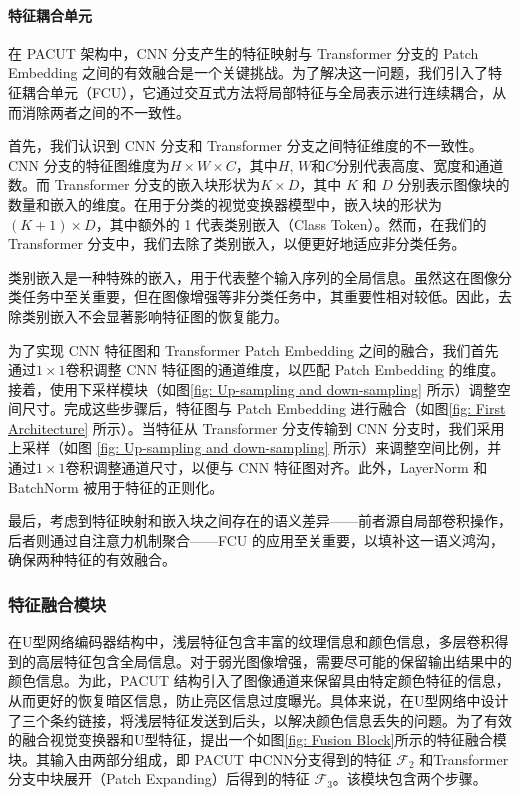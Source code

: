 \documentclass[a4paper]{ctexart}
\begin{document}
	\paragraph{特征耦合单元}
	
	在 PACUT 架构中，CNN 分支产生的特征映射与 Transformer 分支的 Patch Embedding 之间的有效融合是一个关键挑战。为了解决这一问题，我们引入了特征耦合单元（FCU），它通过交互式方法将局部特征与全局表示进行连续耦合，从而消除两者之间的不一致性。
	
	首先，我们认识到 CNN 分支和 Transformer 分支之间特征维度的不一致性。CNN 分支的特征图维度为$H \times W \times C$，其中$H$, $W$和$C$分别代表高度、宽度和通道数。而 Transformer 分支的嵌入块形状为$K \times D$，其中 $K$ 和 $D$ 分别表示图像块的数量和嵌入的维度。在用于分类的视觉变换器模型中，嵌入块的形状为$\left(K+1 \right) \times D$，其中额外的 1 代表类别嵌入（Class Token）。然而，在我们的 Transformer 分支中，我们去除了类别嵌入，以便更好地适应非分类任务。
	
	类别嵌入是一种特殊的嵌入，用于代表整个输入序列的全局信息。虽然这在图像分类任务中至关重要，但在图像增强等非分类任务中，其重要性相对较低。因此，去除类别嵌入不会显著影响特征图的恢复能力。
	
	为了实现 CNN 特征图和 Transformer Patch Embedding 之间的融合，我们首先通过$1 \times 1$卷积调整 CNN 特征图的通道维度，以匹配 Patch Embedding 的维度。接着，使用下采样模块（如图\ref{fig: Up-sampling and down-sampling} 所示）调整空间尺寸。完成这些步骤后，特征图与 Patch Embedding 进行融合（如图\ref{fig: First Architecture} 所示）。当特征从 Transformer 分支传输到 CNN 分支时，我们采用上采样（如图 \ref{fig: Up-sampling and down-sampling} 所示）来调整空间比例，并通过$ 1 \times 1$卷积调整通道尺寸，以便与 CNN 特征图对齐。此外，LayerNorm 和 BatchNorm 被用于特征的正则化。
	
	最后，考虑到特征映射和嵌入块之间存在的语义差异——前者源自局部卷积操作，后者则通过自注意力机制聚合——FCU 的应用至关重要，以填补这一语义鸿沟，确保两种特征的有效融合。
	
	\subsubsection{特征融合模块}
	
	在U型网络编码器结构中，浅层特征包含丰富的纹理信息和颜色信息，多层卷积得到的高层特征包含全局信息。对于弱光图像增强，需要尽可能的保留输出结果中的颜色信息。为此，PACUT 结构引入了图像通道来保留具由特定颜色特征的信息，从而更好的恢复暗区信息，防止亮区信息过度曝光。具体来说，在U型网络中设计了三个条约链接，将浅层特征发送到后头，以解决颜色信息丢失的问题。为了有效的融合视觉变换器和U型特征，提出一个如图\ref{fig: Fusion Block}所示的特征融合模块。其输入由两部分组成，即 PACUT 中CNN分支得到的特征 $\mathcal{F}_2$ 和Transformer分支中块展开（Patch Expanding）后得到的特征 $\mathcal{F}_3$。该模块包含两个步骤。
	
\end{document}
